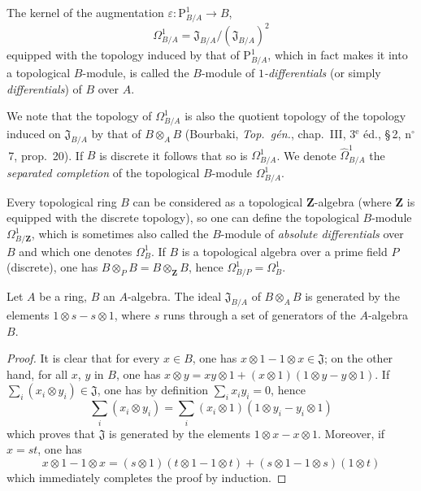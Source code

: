 \begin{definition}[20.4.3]
\label{0.20.4.3}
The kernel of the augmentation $\varepsilon:\mathrm{P}^1_{B/A}\to B$,
\begin{equation}
\tag{20.4.3.1}
  \label{0.20.4.3.1}
  \Omega^1_{B/A} = \mathfrak{J}_{B/A}/(\mathfrak{J}_{B/A})^2
\end{equation}
equipped with the topology induced by that of $\mathrm{P}^1_{B/A}$, which in fact makes it into a topological $B$-module, is called the $B$-module of \emph{$1$-differentials} (or simply \emph{differentials}) of $B$ over $A$.
\end{definition}

We note that the topology of $\Omega^1_{B/A}$ is also the quotient topology of the topology induced on $\mathfrak{J}_{B/A}$ by that of $B\otimes_A B$ (Bourbaki, \emph{Top.\ g\'{e}n.}, chap.~III, 3$^\text{e}$ \'{e}d., \S\,2, n$^\circ$\,7, prop.~20).
If $B$ is discrete it follows that so is $\Omega^1_{B/A}$.
We denote $\widehat{\Omega}^1_{B/A}$ the \emph{separated completion} of the topological $B$-module $\Omega^1_{B/A}$.

Every topological ring $B$ can be considered as a topological $\mathbf{Z}$-algebra (where $\mathbf{Z}$ is equipped with the discrete topology), so one can define the topological $B$-module $\Omega^1_{B/\mathbf{Z}}$, which is sometimes also called the $B$-module of \emph{absolute differentials} over $B$ and which one denotes $\Omega^1_B$.
If $B$ is a topological algebra over a prime field $P$ (discrete), one has $B\otimes_P B=B\otimes_{\mathbf{Z}}B$, hence $\Omega^1_{B/P}=\Omega^1_B$.

\begin{lemma}[20.4.4]
\label{0.20.4.4}
Let $A$ be a ring, $B$ an $A$-algebra.
The ideal $\mathfrak{J}_{B/A}$ of $B\otimes_A B$ is generated by the elements $1\otimes s-s\otimes 1$, where $s$ runs through a set of generators of the $A$-algebra $B$.
\end{lemma}

\begin{proof}
It is clear that for every $x\in B$, one has $x\otimes 1-1\otimes x\in\mathfrak{J}$; on the other hand, for all $x$, $y$ in $B$, one has $x\otimes y=xy\otimes 1+(x\otimes 1)(1\otimes y-y\otimes 1)$.
If $\sum_i (x_i\otimes y_i)\in\mathfrak{J}$, one has by definition $\sum_i x_i y_i=0$, hence
\begin{equation}
\tag{20.4.4.1}
  \label{0.20.4.4.1}
  \sum_i (x_i\otimes y_i) = \sum_i (x_i\otimes 1)(1\otimes y_i-y_i\otimes 1)
\end{equation}
which proves that $\mathfrak{J}$ is generated by the elements $1\otimes x-x\otimes 1$.
Moreover, if $x=st$, one has
\begin{equation}
\tag{20.4.4.2}
  \label{0.20.4.4.2}
  x\otimes 1-1\otimes x = (s\otimes 1)(t\otimes 1-1\otimes t)+(s\otimes 1-1\otimes s)(1\otimes t)
\end{equation}
which immediately completes the proof by induction.
\end{proof}

